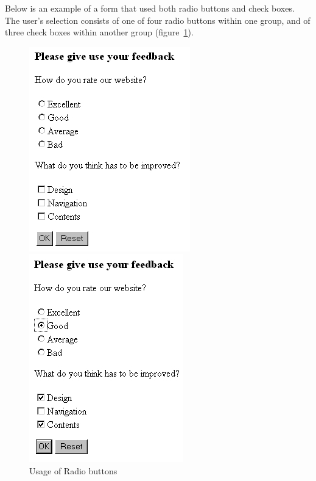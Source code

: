 Below is an example of a form that used both radio buttons and check
boxes. The user's selection consists of one of four radio buttons within
one group, and of three check boxes within another group 
(figure~\ref{Feedback}).

\begin{figure}[t]

\begin{minipage}[b]{0.49\linewidth}
\begin{center}
\includegraphics[clip,width=0.5\linewidth]{pics/modules/44}
\end{center}
\end{minipage}
\hfill
\begin{minipage}[b]{0.49\linewidth}
\begin{center}
\includegraphics[clip,width=0.5\linewidth]{pics/modules/45}
\end{center}
\end{minipage}

\caption[Usage of Radio buttons]{Usage of Radio buttons}
\label{Feedback}

\end{figure}

